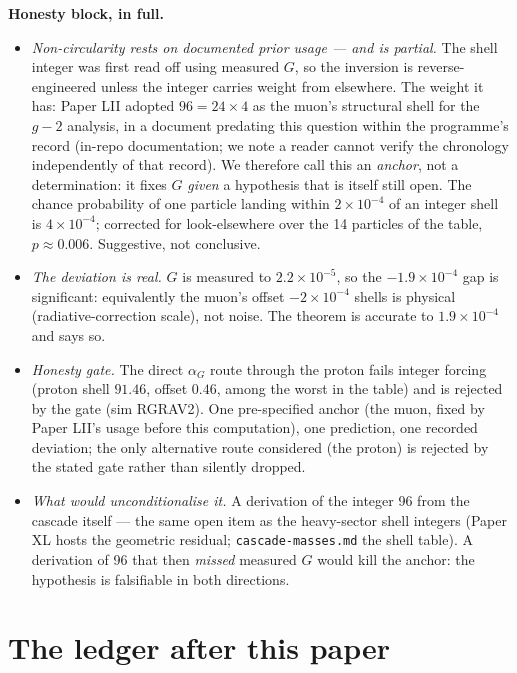 \documentclass[12pt]{article}
\theoremstyle{definition}
\theoremstyle{remark}
\begin{document}
\textbf{Honesty block, in full.}
\begin{itemize}
\item \emph{Non-circularity rests on documented prior usage --- and is partial.} The shell integer was first read off using measured $G$, so the inversion is reverse-engineered unless the integer carries weight from elsewhere. The weight it has: Paper LII \citep{SmartLII} adopted $96 = 24\times4$ as the muon's structural shell for the $g{-}2$ analysis, in a document predating this question within the programme's record (in-repo documentation; we note a reader cannot verify the chronology independently of that record). We therefore call this an \emph{anchor}, not a determination: it fixes $G$ \emph{given} a hypothesis that is itself still open. The chance probability of one particle landing within $2\times10^{-4}$ of an integer shell is $4\times10^{-4}$; corrected for look-elsewhere over the 14 particles of the table, $p \approx 0.006$. Suggestive, not conclusive.
\item \emph{The deviation is real.} $G$ is measured to $2.2\times10^{-5}$, so the $-1.9\times10^{-4}$ gap is significant: equivalently the muon's offset $-2\times10^{-4}$ shells is physical (radiative-correction scale), not noise. The theorem is accurate to $1.9\times10^{-4}$ and says so.
\item \emph{Honesty gate.} The direct $\alpha_G$ route through the proton fails integer forcing (proton shell $91.46$, offset $0.46$, among the worst in the table) and is rejected by the gate (sim RGRAV2). One pre-specified anchor (the muon, fixed by Paper LII's usage before this computation), one prediction, one recorded deviation; the only alternative route considered (the proton) is rejected by the stated gate rather than silently dropped.
\item \emph{What would unconditionalise it.} A derivation of the integer 96 from the cascade itself --- the same open item as the heavy-sector shell integers (Paper XL \citep{SmartXL} hosts the geometric residual; \texttt{cascade-masses.md} the shell table). A derivation of 96 that then \emph{missed} measured $G$ would kill the anchor: the hypothesis is falsifiable in both directions.
\end{itemize}

\section{The ledger after this paper}\label{sec:ledger}
\end{document}
